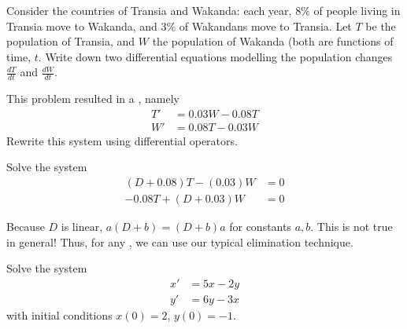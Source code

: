 \begin{applicationActivities}

\begin{activity}{10}
Consider the countries of Transia and Wakanda: each year, \(8\%\) of people living in Transia move to Wakanda, and \(3\%\) of Wakandans move to Transia.
\vfill
Let \(T\) be the population of Transia, and \(W\) the population of Wakanda (both are functions of time, \(t\).
\vfill
Write down two differential equations modelling the population changes \(\frac{dT}{dt}\) and \(\frac{dW}{dt}\).
\end{activity}

\begin{activity}{5}
This problem resulted in a , namely
\vfill
\begin{alignat*}{2}
T' &= 0.03W-0.08T \\
W' &= 0.08T-0.03W
\end{alignat*}
\vfill
Rewrite this system using differential operators.
\end{activity}

\begin{activity}{15}
Solve the system
\begin{alignat*}{2}
(D+0.08)T-(0.03)W &= 0 \\
-0.08T + (D+0.03)W &= 0 
\end{alignat*}
\end{activity}

\begin{observation}
Because \(D\) is linear, \(a(D+b)=(D+b)a\) for constants \(a,b\).  This is not true in general!
\vfill
Thus, for any , we can use our typical elimination technique.
\end{observation}

\begin{activity}{15}
Solve the system
\begin{alignat*}{2}
x'&=5x-2y \\
y'&=6y-3x
\end{alignat*}
with initial conditions \(x(0)=2\), \(y(0)=-1\).
\end{activity}


\end{applicationActivities}
